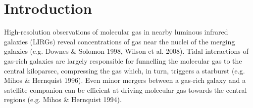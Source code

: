 

\section{Introduction} %


High-resolution observations of molecular gas in nearby luminous infrared galaxies (LIRGs) reveal concentrations of gas near the nuclei of the merging galaxies (e.g. Downes $\&$ Solomon 1998\nocite{Downes1998}, Wilson et al. 2008\nocite{Wilson2008}).  Tidal interactions of gas-rich galaxies are largely responsible for funnelling the molecular gas to the central kiloparsec, compressing the gas which, in turn, triggers a starburst (e.g. Mihos $\&$ Hernquist 1996\nocite{Mihos1996}). Even minor mergers between a gas-rich galaxy and a satellite companion can be efficient at driving molecular gas towards the central regions (e.g. Mihos $\&$ Hernquist 1994\nocite{Mihos1994}). 



